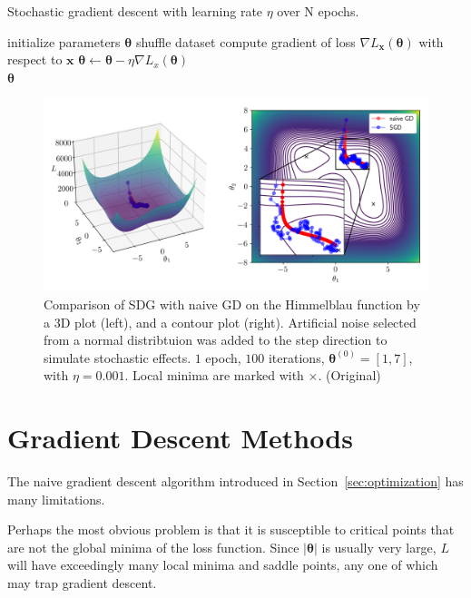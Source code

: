 \documentclass[12pt]{report}
\theoremstyle{definition}
\theoremstyle{remark}
\begin{document}
\begin{algorithm}
    \caption{Stochastic gradient descent with learning rate $\eta$ over N epochs.}\label{alg:sgd}
    \begin{algorithmic}[1]
        \State initialize parameters $\boldsymbol{\theta}$
            \State shuffle dataset
                \State compute gradient of loss $\nabla L_\mathbf{x}(\boldsymbol{\theta})$ with respect to $\mathbf{x}$
                \State $\boldsymbol{\theta} \leftarrow \boldsymbol{\theta} - \eta \nabla L_x(\boldsymbol{\theta})$
            \EndFor
        \EndFor \\
        \Return $\boldsymbol{\theta}$
    \end{algorithmic}
\end{algorithm}
\begin{figure}[h]
    \centering
    \includegraphics[width=\linewidth]{figs/stochastic_comparison.png}
    \caption{Comparison of SDG with naive GD on the Himmelblau function by a 3D plot (left), and a contour plot (right). Artificial noise selected from a normal distribtuion was added to the step direction to simulate stochastic effects. $1$ epoch, $100$ iterations, $\boldsymbol{\theta}^{(0)} = [1,7]$, with $\eta = 0.001$. Local minima are marked with $\times$. (Original)}
    \label{fig:enter-label}
\end{figure}

\section{Gradient Descent Methods}\label{sec:gradient-descent-methods}

The naive gradient descent algorithm introduced in Section~\ref{sec:optimization} has many limitations.

Perhaps the most obvious problem is that it is susceptible to critical points that are not the global minima of the loss function. Since $|\boldsymbol{\theta}|$ is usually very large, $L$ will have exceedingly many local minima and saddle points, any one of which may trap gradient descent.
\end{document}
